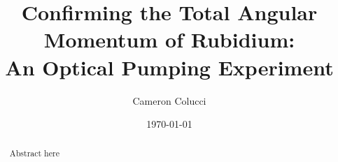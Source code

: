 \documentclass[
 reprint,
linenumbers,
aps,amsmath
]{revtex4-2}
\begin{document}

\title{Confirming the Total Angular Momentum of Rubidium:\\ 
An Optical Pumping Experiment}%

\author{Cameron Colucci}




\date{\today}%

\begin{abstract}
Abstract here

\end{abstract}

\maketitle
\end{document}

